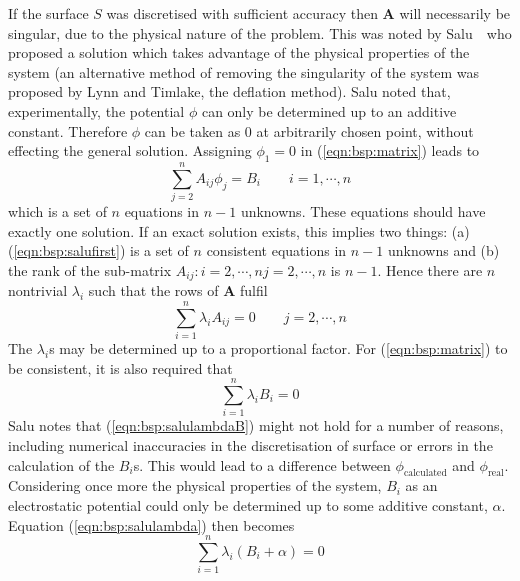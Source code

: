 If the surface $S$ was discretised with sufficient accuracy then $\mathbf{A}$
will necessarily be singular, due to the physical nature of the problem.
This was noted by Salu~\cite{Salu1980}\ who proposed a solution which takes
advantage of the physical properties of the system (an alternative method of
removing the singularity of the system was proposed by Lynn and Timlake, the
deflation method).
Salu noted that, experimentally, the potential $\phi$ can only be determined up to
an additive constant.
Therefore $\phi$ can be taken as $0$ at arbitrarily chosen point, without
effecting the general solution.
Assigning $\phi_1 = 0$ in (\ref{eqn:bsp:matrix}) leads to
\begin{equation}
\label{eqn:bsp:salufirst}
\sum_{j=2}^n A_{ij} \phi_j = B_i \quad\quad  i = 1,\cdots, n
\end{equation}
which is a set of $n$ equations in $n-1$ unknowns.
These equations should have exactly one solution.
If an exact solution exists, this implies two things: (a)
(\ref{eqn:bsp:salufirst}) is a set of $n$ consistent equations in $n-1$ unknowns
and (b) the rank of the sub-matrix $A_{ij}: i=2,\cdots,n j=2,\cdots,n$ is $n-1$.
Hence there are $n$ nontrivial $\lambda_i$ such that the rows of $\textbf{A}$
fulfil
\begin{equation}
\label{eqn:bsp:salulambda}
\sum_{i=1}^n \lambda_i A_{ij}  = 0 \quad\quad  j = 2,\cdots, n
\end{equation}
The $\lambda_i$s may be determined up to a proportional factor.
For (\ref{eqn:bsp:matrix}) to be consistent, it is also required that
\begin{equation}
\label{eqn:bsp:salulambdaB}
\sum_{i=1}^n \lambda_i B_i  = 0
\end{equation}
Salu notes that (\ref{eqn:bsp:salulambdaB}) might not hold for a number of
reasons, including numerical inaccuracies in the discretisation of surface or
errors in the calculation of the $B_i$s.
This would lead to a difference between $\phi_{\text{calculated}}$ and
$\phi_{\text{real}}$.
Considering once more the physical properties of the system, $B_i$ as an
electrostatic potential could only be determined up to some additive constant,
$\alpha$.
Equation (\ref{eqn:bsp:salulambda}) then becomes
\begin{equation}
\label{eqn:bsp:salulambdaalpha}
\sum_{i=1}^n \lambda_i \left(B_i+\alpha\right)  = 0
\end{equation}

